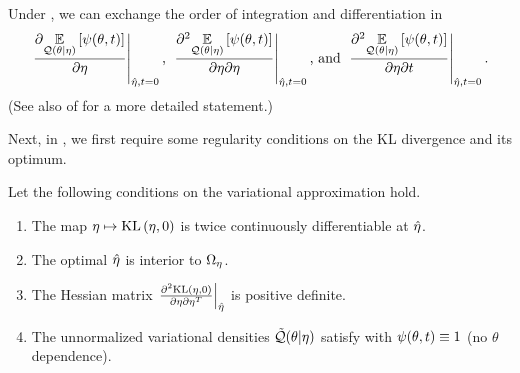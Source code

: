 \begin{lem}
%
Under , we can exchange the order of integration
and differentiation in
%
\begin{align*}
%
\fracat{\partial\expect{\q(\theta \vert \eta)}{\psi(\theta, \t)}}
       {\partial\eta}{\etaopt, \t=0}
\textrm{, }
\fracat{\partial^2\expect{\q(\theta \vert \eta)}{\psi(\theta, \t)}}
       {\partial\eta \partial\eta}{\etaopt, \t=0}
\textrm{, and }
\fracat{\partial^2\expect{\q(\theta \vert \eta)}{\psi(\theta, \t)}}
       {\partial\eta \partial \t}{\etaopt, \t=0}.
%
\end{align*}
%
(See also  of 
for a more detailed statement.)
%
\end{lem}

Next, in , we first require some regularity conditions on
the KL divergence and its optimum.

\begin{assu}
%
Let the following conditions on the variational approximation hold.
%
\begin{enumerate}
%
    \item {} The map $\eta \mapsto \mathrm{KL}\left(\eta, 0\right)$ is twice
    continuously differentiable at $\hat\eta$.

    \item {} The optimal $\hat\eta$ is interior
    to $\Omega_{\eta}$.

    \item{} The Hessian matrix $\left.\frac{\partial^2 \mathrm{KL}\left(\eta,
    0\right)}{\partial \eta \partial \eta^T}\right\vert_{\hat\eta}$ is positive definite.

    \item{} The unnormalized variational densities $\tilde{\mathcal{Q}}(\theta
    \vert \eta)$ satisfy  with $\psi(\theta, t) \equiv
    1$ (no $\theta$ dependence).
%
\end{enumerate}
%
\end{assu}

